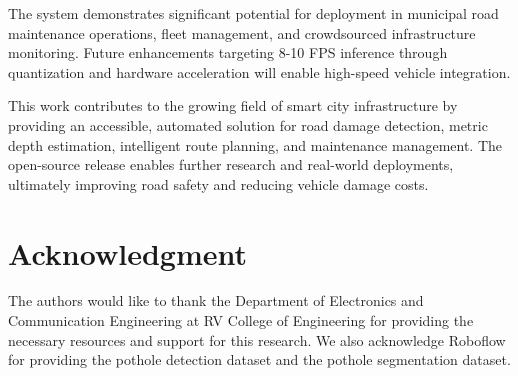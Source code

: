 \documentclass{ieeeaccess}
\begin{document}
The system demonstrates significant potential for deployment in municipal road maintenance operations, fleet management, and crowdsourced infrastructure monitoring. Future enhancements targeting 8-10 FPS inference through quantization and hardware acceleration will enable high-speed vehicle integration.

This work contributes to the growing field of smart city infrastructure by providing an accessible, automated solution for road damage detection, metric depth estimation, intelligent route planning, and maintenance management. The open-source release enables further research and real-world deployments, ultimately improving road safety and reducing vehicle damage costs.

\section*{Acknowledgment}

The authors would like to thank the Department of Electronics and Communication Engineering at RV College of Engineering for providing the necessary resources and support for this research. We also acknowledge Roboflow for providing the pothole detection dataset and the pothole segmentation dataset.
\end{document}
